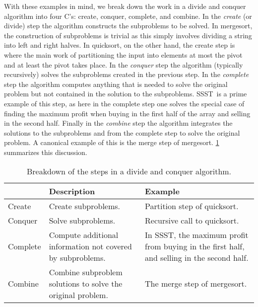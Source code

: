 \documentclass[12pt]{article}
\newcommand{\SSST}{\textsc{SSST}}
\theoremstyle{definition}
\begin{document}
With these examples in mind, we break down the work in a divide and conquer algorithm into four C's:
create, conquer, complete, and combine. 
In the {\em create} (or divide) step the algorithm constructs the subproblems to be solved. 
In mergesort, the construction of subproblems is trivial as this simply involves dividing a string into left and right halves.  In quicksort, 
on the other hand, the create step is where the main work of partitioning the input into elements at most the pivot and at least the pivot takes place.
In the {\em conquer} step the algorithm (typically recursively) solves the subproblems created in the previous step. In the {\em complete} step the 
algorithm computes anything that is needed to solve the original problem but not contained in the solution to the subproblems.  \SSST\ is a prime example of this step, as here in the complete step one solves the special case of finding the maximum profit when buying in the first half of the array and selling in the second half. 
Finally in the {\em combine} step the algorithm integrates the solutions to the subproblems and from the complete step to solve the original problem.
A canonical example of this is the merge step of mergesort. \cref{table:dandc} summarizes this discussion.
\begin{table}
\begin{tabularx}{\linewidth}{|l|X|X|}
  \hline
  & Description & Example  \\
  \hline
Create & Create subproblems. & Partition step of quicksort. \\
\hline
Conquer & Solve subproblems. & Recursive call to quicksort. \\
\hline
Complete & Compute additional information not covered by subproblems. & 
In \SSST, the maximum profit from buying in the first half, and selling in the second half.\\
\hline
Combine & Combine subproblem solutions to solve the original problem. & 
The merge step of mergesort. \\
\hline
\end{tabularx}
\caption{Breakdown of the steps in a divide and conquer algorithm.}
\label{table:dandc}
\end{table}
\end{document}
